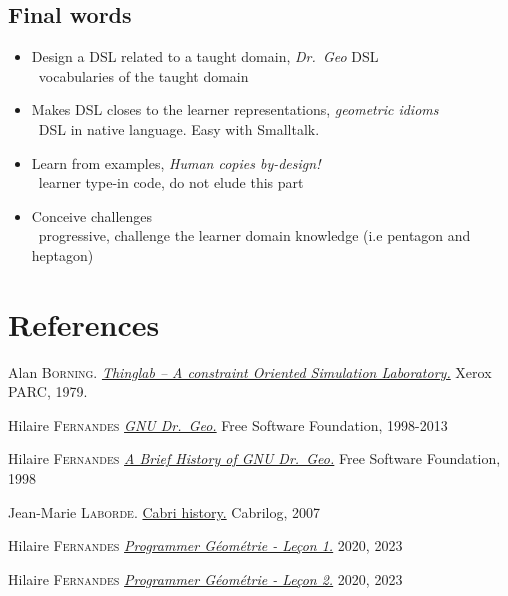 \documentclass{beamer}
\newcommand{\tip}{\boldmath{\textcolor{red}{$\Rightarrow$}}}
\newcommand{\drgeo}{Dr.~Geo}
\begin{document}
\subsection{Final words}
\begin{frame}
  \begin{spacing}{1.5}
  \begin{itemize}
  \item Design a DSL related to a taught domain, \emph{\drgeo} DSL \\
    \tip\ vocabularies of the taught domain
  \item Makes DSL closes to the learner representations, \emph{geometric idioms} \\
    \tip\ DSL in native language. Easy with Smalltalk.
  \item Learn from examples, \emph{Human copies by-design!} \\
    \tip\ learner type-in code, do not elude this part
  \item Conceive challenges \\
    \tip\ progressive, challenge the learner domain
    knowledge (i.e pentagon and heptagon)
\end{itemize}
\end{spacing}

  
\end{frame}
\section{References}
\begin{frame}
  \fontsize{10pt}{8pt}\selectfont
  \begin{thebibliography}{99}

    Alan \textsc{Borning}.
    \href{http://esug.org/data/HistoricalDocuments/ThingLab/ThingLab-index.html}{\emph{Thinglab -- A constraint Oriented Simulation Laboratory.}} Xerox PARC, 1979.

    Hilaire \textsc{Fernandes}
    \href{https://www.gnu.org/software/dr-geo/}{\emph{GNU \drgeo.}} Free Software Foundation, 1998-2013
    
    Hilaire \textsc{Fernandes}
    \href{https://www.gnu.org/software/dr-geo/a_brief_history_of_GNU_DrGeo.html}{\emph{A Brief History of GNU \drgeo.}} Free Software Foundation, 1998
    
    Jean-Marie \textsc{Laborde}.
    \href{http://www.cabri.net/cabri2/historique-e.php}{Cabri history.} Cabrilog, 2007

    Hilaire \textsc{Fernandes}
    \href{https://gnu-drgeo.blogspot.com/2023/10/programmer-geometrie-lecon-1.html}{\emph{Programmer Géométrie - Leçon 1.}} 2020, 2023

    Hilaire \textsc{Fernandes}
    \href{https://gnu-drgeo.blogspot.com/2023/10/programmer-geometrie-lecon-2.html}{\emph{Programmer Géométrie - Leçon 2.}} 2020, 2023

    
  \end{thebibliography}
\end{frame}
\end{document}
